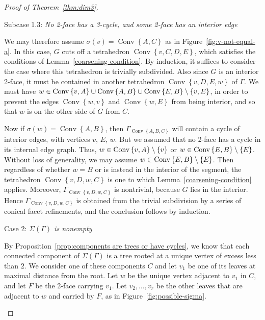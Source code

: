 \documentclass[ALCO,ThmDefs,Unicode,epreuves]{cedram}
\DeclareMathOperator{\Convop}{Conv}
\newcommand{\Conv}[1]{\Convop\left\{{#1}\right\}}
\DeclarePairedDelimiter{\set}{\{}{\}}
\newenvironment{proofsection}[2]{\begin{enonce*}[remark]{#1 \emph{#2}} \ }{\end{enonce*}}
\begin{document}
\begin{proof}[Proof of Theorem~\ref{thm:dim3}]
\begin{proofsection}{Subcase 1.3:}{No 2-face has a 3-cycle, and some 2-face has an interior edge}
 
We may therefore assume $\sigma(v) = \Conv{A,C}$ as in Figure~\ref{fig:v-not-equal-a}. In this case, $G$ cuts off a tetrahedron $\Conv{v,C,D,E}$, which satisfies the conditions of Lemma~\ref{coarsening-condition}. By induction, it suffices to consider the case where this tetrahedron is trivially subdivided. Also since $G$ is an interior 2-face, it must be contained in another tetrahedron $\Conv{v,D,E,w}$ of $\Gamma$. We must have $w\in \Conv{v,A}\cup\Conv{A,B}\cup \Conv{E,B}\setminus\set{v,E}$, in order to prevent the edges $\Conv{w,v}$ and $\Conv{w,E}$ from being interior, and so that $w$ is on the other side of $G$ from $C$.

Now if $\sigma(w)=\Conv{A,B}$, then $\Gamma_{\Conv{A,B,C}}$ will contain a cycle of interior edges, with vertices $v$, $E$, $w$. But we assumed that no 2-face has a cycle in its internal edge graph. Thus, $w\in\Conv{v,A}\setminus \set{v}$ or $w\in\Conv{E,B}\setminus\set{E}$. Without loss of generality, we may assume $w\in\Conv{E,B}\setminus\set{E}$. Then regardless of whether $w=B$ or is instead
in the interior of the segment, the tetrahedron $\Conv{v,D,w,C}$ is one to which Lemma~\ref{coarsening-condition} applies. Moreover, $\Gamma_{\Conv{v,D,w,C}}$ is nontrivial, because $G$ lies in the interior. Hence $\Gamma_{\Conv{v,D,w,C}}$ is obtained from the trivial subdivision by a series of conical facet refinements, and the conclusion follows by induction.
\end{proofsection}

\begin{proofsection}{Case 2:}{$\Sigma(\Gamma)$ is nonempty}

By Proposition~\ref{prop:components are trees or have cycles}, we know
that each connected component of $\Sigma(\Gamma)$ is a tree rooted at a unique vertex of excess less than $2$. We consider one of these components $C$ and let $v_1$ be one of its leaves at maximal distance from the root. Let $w$ be the unique vertex adjacent to $v_1$ in $C$, and let $F$ be the 2-face carrying $v_1$. Let $v_2, \dots, v_r$ be the other leaves that are adjacent to $w$ and carried by $F$, as in Figure~\ref{fig:possible-sigma}. 

\begin{figure}[htb]\centering
\vspace*{-2mm}



\end{figure}
\end{proofsection}
\end{proof}
\end{document}
